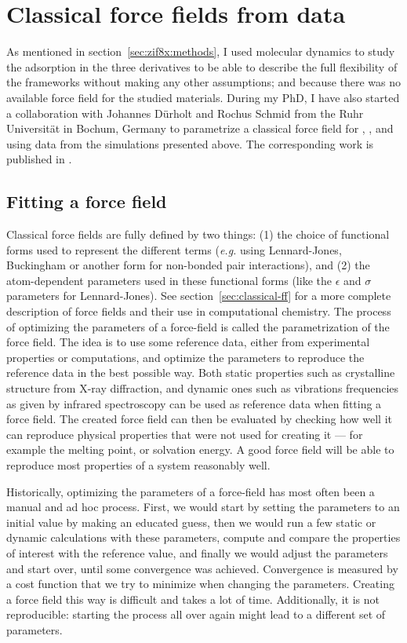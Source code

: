 \documentclass[thesis]{subfiles}
\begin{document}
\section{Classical force fields from \abinitio data}
\label{sec:classical-ff-parametrize}

As mentioned in section~\ref{sec:zif8x:methods}, I used \abinitio molecular
dynamics to study the adsorption in the three  derivatives to be able to
describe the full flexibility of the frameworks without making any other
assumptions; and because there was no available force field for the studied
materials. During my PhD, I have also started a collaboration with Johannes
Dürholt and Rochus Schmid from the Ruhr Universität in Bochum, Germany to
parametrize a classical force field for , \ZIFCl, and \ZIFBr using data
from the \abinitio simulations presented above. The corresponding work is
published in \cite{Duerholt2019}.

\subsection{Fitting a force field}

Classical force fields are fully defined by two things: (1) the choice of
functional forms used to represent the different terms (\emph{e.g.} using
Lennard-Jones, Buckingham or another form for non-bonded pair interactions), and
(2) the atom-dependent parameters used in these functional forms (like the
$\epsilon$ and $\sigma$ parameters for Lennard-Jones). See
section~\ref{sec:classical-ff} for a more complete description of force fields
and their use in computational chemistry. The process of optimizing the
parameters of a force-field is called the parametrization of the force field.
The idea is to use some reference data, either from experimental properties or
\abinitio computations, and optimize the parameters to reproduce the reference
data in the best possible way. Both static properties such as crystalline
structure from X-ray diffraction, and dynamic ones such as vibrations
frequencies as given by infrared spectroscopy can be used as reference data when
fitting a force field. The created force field can then be evaluated by checking
how well it can reproduce physical properties that were not used for creating it
--- for example the melting point, or solvation energy. A good force field will
be able to reproduce most properties of a system reasonably well.

Historically, optimizing the parameters of a force-field has most often been a
manual and ad hoc process. First, we would start by setting the parameters to an
initial value by making an educated guess, then we would run a few static or
dynamic calculations with these parameters, compute and compare the properties
of interest with the reference value, and finally we would adjust the parameters
and start over, until some convergence was achieved. Convergence is measured by
a cost function that we try to minimize when changing the parameters. Creating a
force field this way is difficult and takes a lot of time. Additionally, it is
not reproducible: starting the process all over again might lead to a different
set of parameters.
\end{document}
